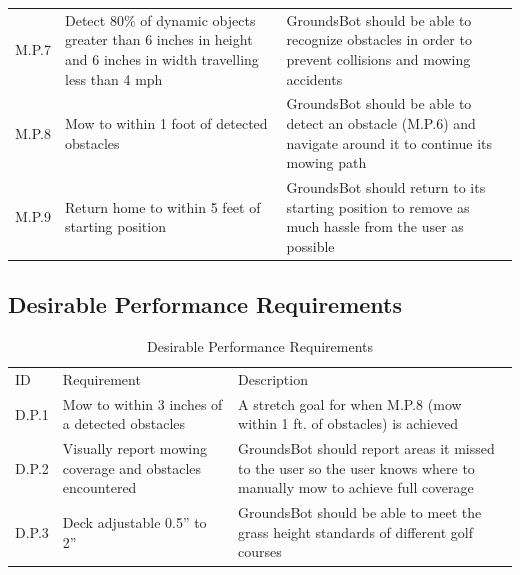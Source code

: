 \documentclass[12pt]{extarticle}
\begin{document}
\begin{center}
\begin{table}[H]
\begin{tabularx}{\textwidth}{ lXX }
    M.P.7 & Detect 80\% of dynamic objects greater than 6 inches in height and 6 inches in width travelling less than 4 mph &  GroundsBot should be able to recognize obstacles in order to prevent collisions and mowing accidents\\

    M.P.8 & Mow to within 1 foot of detected obstacles &  GroundsBot should be able to detect an obstacle (M.P.6) and navigate around it to continue its mowing path\\

    M.P.9 & Return home to within 5 feet of starting position & GroundsBot should return to its starting position to remove as much hassle from the user as possible\\
    
	\end{tabularx}
  \end{table}
\end{center}

\subsection{Desirable Performance Requirements}
\begin{center}
  \begin{table}[H]
  \caption{Desirable Performance Requirements}
  \label{table: desirable performance}
  

  \def\arraystretch{1.5}
  \begin{tabularx}{\textwidth}{ lXX }
      \hline
	  \sffamily\normalsize{ID} & \sffamily\normalsize{Requirement} & \sffamily\normalsize{Description} \\
	  D.P.1 & Mow to within 3 inches of a detected obstacles & A stretch goal for when M.P.8 (mow within 1 ft. of obstacles) is achieved\\

D.P.2 & Visually report mowing coverage and obstacles encountered & GroundsBot should report areas it missed to the user so the user knows where to manually mow to achieve full coverage\\

D.P.3 & Deck adjustable 0.5” to 2” & GroundsBot should be able to meet the grass height standards of different golf courses\\
  \end{tabularx}
  \end{table}
\end{center}
\end{document}
